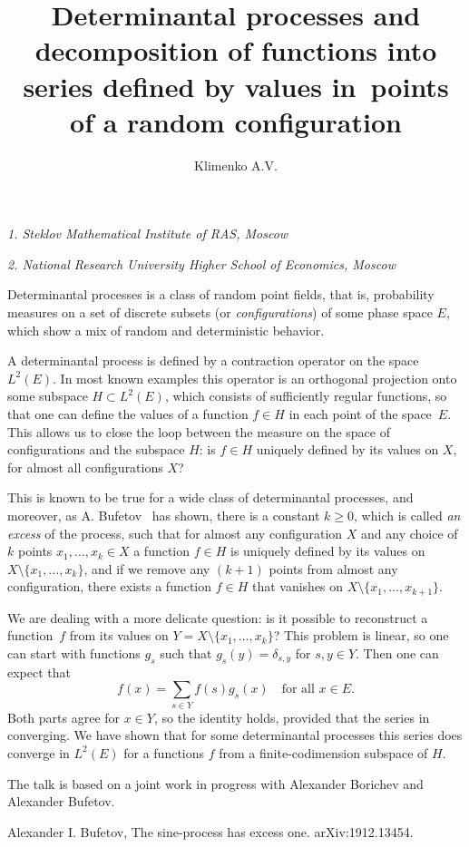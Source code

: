 \documentclass[12pt]{article}
\title{\bf\Large Determinantal processes and decomposition of functions into series defined by values in~points of a random configuration}
\author{Klimenko A.V.}
\date{}
\begin{document}
\begin{center}
	\maketitle
	{\large\textit{1. Steklov Mathematical Institute of RAS, Moscow}}
	
	{\large\textit{2. National Research University Higher School of Economics, Moscow}}
\end{center}

Determinantal processes is a class of random point fields, that is,  probability measures on a set of discrete subsets (or \emph{configurations}) of some phase space $E$, which show a mix of random and deterministic behavior.

A determinantal process is defined by a contraction operator on the space $L^2(E)$.
In most known examples this operator is an orthogonal projection onto some subspace $H\subset L^2(E)$, which consists of sufficiently regular functions, so that one can define the values of a function $f\in H$ in each point of the space~$E$. 
This allows us to close the loop between the measure on the space of configurations and the subspace $H$: is $f\in H$ uniquely defined by its values on $X$, for almost all configurations $X$?
 
This is known to be true for a wide class of determinantal processes, and moreover, as A. Bufetov~\cite{Bufetov-Sine} has shown, there is a constant $k\ge 0$, which is called \emph{an excess} of the process, such that for almost any configuration $X$ and any choice of $k$ points $x_1,\dots,x_k\in X$ a function $f\in H$ is uniquely defined by its values on $X\setminus\{x_1,\dots,x_k\}$, and if we remove any $(k+1)$ points from almost any configuration, there exists a function $f\in H$ that vanishes on $X\setminus\{x_1,\dots,x_{k+1}\}$.

We are dealing with a more delicate question: is it possible to reconstruct a function~$f$ from its values on $Y=X\setminus\{x_1,\dots,x_k\}$? This problem is linear, so one can start with functions $g_s$ such that $g_s(y)=\delta_{s,y}$ for $s,y\in Y$.
Then one can expect that
$$
	f(x)=\sum_{s\in Y} f(s)g_s(x)\quad\mbox{for all }x\in E.
$$
Both parts agree for $x\in Y$, so the identity holds, provided that the series in converging. We have shown that for some determinantal processes this series does converge in $L^2(E)$ for a functions $f$ from a finite-codimension subspace of $H$.

The talk is based on a joint work in progress with Alexander Borichev and Alexander Bufetov.



\begin{thebibliography}{99}
	Alexander I. Bufetov, The sine-process has excess one.  	arXiv:1912.13454.
	
\end{thebibliography}
\end{document}
